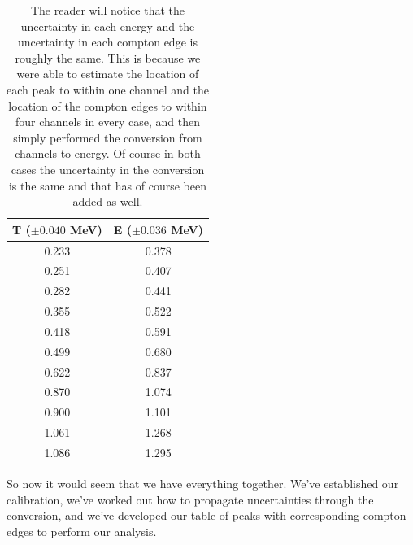\documentclass[reprint, nobibnotes, amssymb, amsmath, amsfonts, physics, mathtools, mathrsfs, floatfix]{revtex4-1}
\begin{document}
      \begin{table}[h]
        \centering
        \begin{tabular}{|c|c|}
          \hline
          T ($\pm 0.040$ MeV) & E ($\pm 0.036$ MeV) \\ \hline

          0.233 & 0.378 \\ \hline
          0.251 & 0.407 \\ \hline
          0.282 & 0.441 \\ \hline
          0.355 & 0.522 \\ \hline
          0.418 & 0.591 \\ \hline
          0.499 & 0.680 \\ \hline
          0.622 & 0.837 \\ \hline
          0.870 & 1.074 \\ \hline
          0.900 & 1.101 \\ \hline
          1.061 & 1.268 \\ \hline
          1.086 & 1.295 \\ \hline
        \end{tabular}
        \caption{The reader will notice that the uncertainty in each energy and the uncertainty in each compton edge is roughly the same.  This is because we were able to estimate the location of each peak to within one channel and the location of the compton edges to within four channels in every case, and then simply performed the conversion from channels to energy.  Of course in both cases the uncertainty in the conversion is the same and that has of course been added as well. \label{tab:analysis_points}}
      \end{table}

      So now it would seem that we have everything together.  We've established our calibration, we've worked out how to propagate uncertainties through the conversion, and we've developed our table of peaks with corresponding compton edges to perform our analysis.
\end{document}
